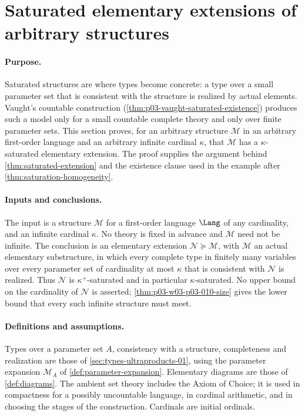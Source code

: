 \section{Saturated elementary extensions of arbitrary structures}
\label{sec:p03-w03-p03-010-saturated-extension}

\paragraph{Purpose.}
Saturated structures are where types become concrete: a type over a small
parameter set that is consistent with the structure is realized by actual
elements.  Vaught's countable construction
(\cref{thm:p03-vaught-saturated-existence}) produces such a model only for a
small countable complete theory and only over finite parameter sets.  This
section proves, for an arbitrary structure \(\mathcal M\) in an arbitrary
first-order language and an arbitrary infinite cardinal \(\kappa\), that
\(\mathcal M\) has a \(\kappa\)-saturated elementary extension.  The proof
supplies the argument behind \cref{thm:saturated-extension} and the
existence clause used in the example after
\cref{thm:saturation-homogeneity}.

\paragraph{Inputs and conclusions.}
The input is a structure \(\mathcal M\) for a first-order language
\(\Lang\) of any cardinality, and an infinite cardinal \(\kappa\).  No
theory is fixed in advance and \(\mathcal M\) need not be infinite.  The
conclusion is an elementary extension \(\mathcal N\succcurlyeq\mathcal M\),
with \(\mathcal M\) an actual elementary substructure, in which every complete
type in finitely many variables over every parameter set of cardinality at
most \(\kappa\) that is consistent with \(\mathcal N\) is realized.  Thus
\(\mathcal N\) is \(\kappa^+\)-saturated and in particular
\(\kappa\)-saturated.  No upper bound on the cardinality of \(\mathcal N\) is
asserted; \cref{thm:p03-w03-p03-010-size} gives the lower bound that every
such infinite structure must meet.

\paragraph{Definitions and assumptions.}
Types over a parameter set \(A\), consistency with a structure, completeness
and realization are those of \cref{sec:types-ultraproducts-01}, using the
parameter expansion \(\mathcal M_A\) of \cref{def:parameter-expansion}.
Elementary diagrams are those of \cref{def:diagrams}.  The ambient set
theory includes the Axiom of Choice; it is used in compactness for a
possibly uncountable language, in cardinal arithmetic, and in choosing the
stages of the construction.  Cardinals are initial ordinals.

